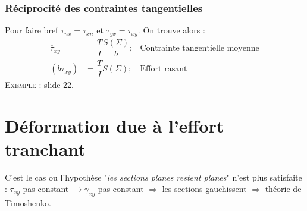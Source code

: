 		\subsubsection{Réciprocité des contraintes tangentielles}
		Pour faire bref $\tau_{nx} = \tau_{xn}$ et $\tau_{yx}=\tau_{xy}$. On 
		trouve alors :
		\begin{equation}
		\begin{array}{lll}
		\overline{\tau}_{xy} &= \dfrac{T}{I}\dfrac{S(\Sigma)}{b}; & \text{Contrainte 
		tangentielle moyenne}\\
		(b\overline{\tau}_{xy}) &= \dfrac{T}{I}S(\Sigma); & \text{Effort rasant}
		\end{array}
		\end{equation}		
		\textsc{Exemple :} slide 22.
	
	
\section{Déformation due à l'effort tranchant}
C'est le cas ou l'hypothèse "\textit{les sections planes restent planes}" n'est plus 
satisfaite : $\tau_{xy}$ pas constant $\rightarrow \gamma_{xy}$ pas constant $\Rightarrow 
$ les sections gauchissent $\Rightarrow$ théorie de Timoshenko.
	
	
